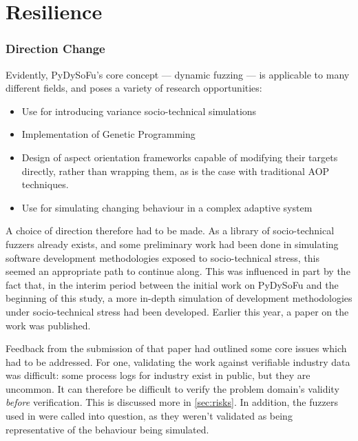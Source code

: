 \documentclass[draft]{article}
\begin{document}
\part{Resilience}

\section{Direction Change}
Evidently, PyDySoFu's core concept --- dynamic fuzzing --- is applicable to many
different fields, and poses a variety of research opportunities:

\begin{itemize}
\item Use for introducing variance socio-technical simulations\cite{honours_thesis}
\item Implementation of Genetic Programming
\item Design of aspect orientation frameworks capable of modifying their targets
  directly, rather than wrapping them, as is the case with traditional AOP
  techniques\cite{aspectj}.
\item Use for simulating changing behaviour in a complex adaptive system
\end{itemize}

A choice of direction therefore had to be made. As a library of socio-technical
fuzzers already exists\cite{fuzzi_moss}, and some preliminary work had been done
in simulating software development methodologies exposed to socio-technical
stress, this seemed an appropriate path to continue along. This was influenced
in part by the fact that, in the interim period between the initial work on
PyDySoFu\cite{honours_thesis} and the beginning of this study, a more
in-depth simulation of development methodologies under socio-technical stress
had been developed. Earlier this year, a paper on the work was
published\cite{caise_forum_18}.\par

Feedback from the submission of that paper had outlined some core issues which
had to be addressed. For one, validating the work against verifiable industry
data was difficult: some process logs for industry exist in public, but they are
uncommon. It can therefore be difficult to verify the problem domain's validity
\emph{before} verification. This is discussed more in \cref{sec:risks}. In
addition, the fuzzers used in \cite{caise_forum_18} were called into question,
as they weren't validated as being representative of the behaviour being
simulated.\par
\end{document}
